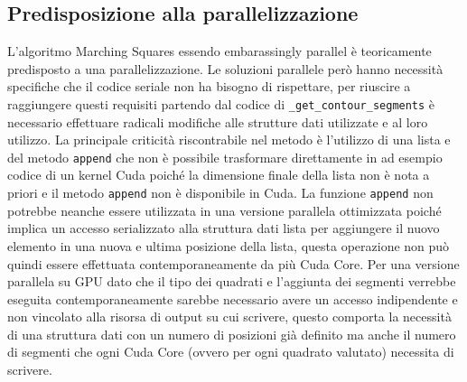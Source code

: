 \documentclass[12pt,a4paper]{report}
\begin{document}
\subsection{Predisposizione alla parallelizzazione}
L'algoritmo Marching Squares essendo embarassingly parallel è teoricamente predisposto a una parallelizzazione. Le soluzioni parallele però hanno necessità specifiche che il codice seriale non ha bisogno di rispettare, per riuscire a raggiungere questi requisiti partendo dal codice di \verb|_get_contour_segments| è necessario effettuare radicali modifiche alle strutture dati utilizzate e al loro utilizzo. \newline
La principale criticità riscontrabile nel metodo è l'utilizzo di una lista e del metodo \verb|append| che non è possibile trasformare direttamente in ad esempio codice di un kernel Cuda poiché la dimensione finale della lista non è nota a priori e il metodo  \verb|append| non è disponibile in Cuda.  La funzione \verb|append| non potrebbe neanche essere utilizzata in una versione parallela ottimizzata poiché implica un accesso serializzato alla struttura dati lista per aggiungere il nuovo elemento in una nuova e ultima posizione della lista, questa operazione non può quindi essere effettuata contemporaneamente da più Cuda Core.  Per una versione parallela su GPU dato che il tipo dei quadrati e l'aggiunta dei segmenti verrebbe eseguita contemporaneamente sarebbe necessario avere un accesso indipendente e non vincolato alla risorsa di output su cui scrivere, questo comporta la necessità di una struttura dati con un numero di posizioni già definito ma anche il numero di segmenti che ogni Cuda Core (ovvero per ogni quadrato valutato) necessita di scrivere.

\end{document}
